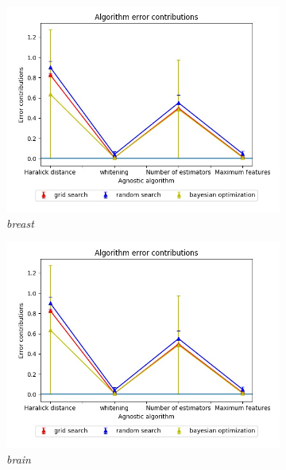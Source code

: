 \begin{figure}[ht!]
\centering
\begin{subfigure}{.5\textwidth}
  \centering
  \includegraphics[scale=0.37]{img/EP/agnostic_error_hyper_breast}
  \caption{\textit{breast}}
  \label{fig:sfig1}
\end{subfigure}%
\begin{subfigure}{.5\textwidth}
  \centering
  \includegraphics[scale=0.37]{img/EP/agnostic_error_hyper_breast}
  \caption{\textit{brain}}
  \label{fig:sfig2}
\end{subfigure}
\begin{subfigure}{.5\textwidth}

\end{subfigure}
\end{figure}

